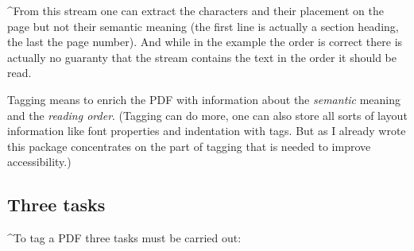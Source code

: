 \documentclass[DIV=12,parskip=half-,bibliography=totoc]{scrartcl}
\newcommand\PDF{PDF}
\begin{document}
\TagP^From this stream one can extract the characters and their placement on the page but not their semantic meaning  (the first line is actually a section heading, the last the page number). And while in the example the order is correct there is actually no guaranty that the stream contains the text in the order it should be read.

\TagP Tagging means to enrich the \PDF{} with information about the \emph{semantic} meaning and the \emph{reading order}. (Tagging can do more, one can also store all sorts of layout information like font properties and indentation with tags. But as I already wrote this package concentrates on the part of tagging that is needed to improve accessibility.)\TagPend




\subsection{Three tasks}
\TagP^To tag a \PDF{} three tasks must be  carried out:\TagPend
\end{document}
